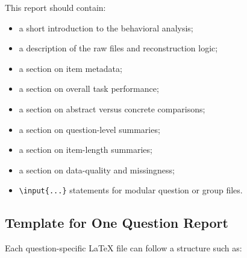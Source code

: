 \documentclass[11pt]{article}
\begin{document}
This report should contain:
\begin{itemize}
    \item a short introduction to the behavioral analysis;
    \item a description of the raw files and reconstruction logic;
    \item a section on item metadata;
    \item a section on overall task performance;
    \item a section on abstract versus concrete comparisons;
    \item a section on question-level summaries;
    \item a section on item-length summaries;
    \item a section on data-quality and missingness;
    \item \texttt{\textbackslash input\{...\}} statements for modular question or group files.
\end{itemize}

\subsection{Template for One Question Report}
Each question-specific \LaTeX{} file can follow a structure such as:
\end{document}
